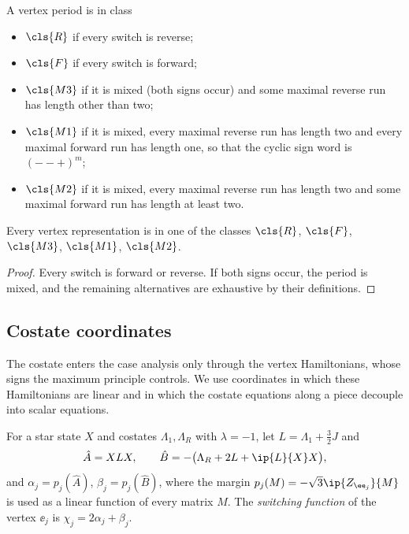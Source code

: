 \begin{definition}\label{def:classes}
A vertex period is in class
\begin{itemize}
\item $\cls{R}$ if every switch is reverse;
\item $\cls{F}$ if every switch is forward;
\item $\cls{M3}$ if it is mixed (both signs occur) and some maximal reverse run has length
  other than two;
\item $\cls{M1}$ if it is mixed, every maximal reverse run has length two and every maximal
  forward run has length one, so that the cyclic sign word is $(--+)^m$;
\item $\cls{M2}$ if it is mixed, every maximal reverse run has length two and some maximal
  forward run has length at least two.
\end{itemize}
\end{definition}

\begin{proposition}[Partition]\label{prop:partition}
Every vertex representation is in one of the classes $\cls{R}$, $\cls{F}$, $\cls{M3}$,
$\cls{M1}$, $\cls{M2}$.
\end{proposition}

\begin{proof}
Every switch is forward or reverse. If both signs occur, the period is mixed, and the remaining
alternatives are exhaustive by their definitions.
\end{proof}

\subsection{Costate coordinates}\label{sec:per-costate}

The costate enters the case analysis only through the vertex Hamiltonians, whose signs the
maximum principle controls. We use coordinates in which these Hamiltonians are linear and in
which the costate equations along a piece decouple into scalar equations.

\begin{definition}\label{def:costate-coordinates}
For a star state $X$ and costates $\Lambda_1,\Lambda_R$ with $\lambda=-1$, let
$L=\Lambda_1+\frac32J$ and
\[
  \hat A=XLX,\qquad \hat B=-\bigl(\Lambda_R+2L+\ip{L}{X}X\bigr),
\]
and $\alpha_j=p_j(\hat A)$, $\beta_j=p_j(\hat B)$,
where the margin $p_j(M)=-\sqrt3\ip{Z_{\ee_j}}{M}$ is used as a linear function of every
matrix $M$. The \emph{switching function} of the vertex $\ee_j$ is $\chi_j=2\alpha_j+\beta_j$.
\end{definition}

